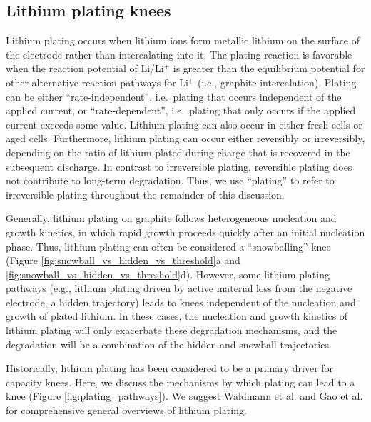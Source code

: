 \documentclass[journal=jpclcd,manuscript=article]{achemso}
\begin{document}
\subsection{Lithium plating knees}

Lithium plating occurs when lithium ions form metallic lithium on the surface of the electrode rather than intercalating into it. The plating reaction is favorable when the reaction potential of Li/Li$^+$ is greater than the equilibrium potential for other alternative reaction pathways for Li$^+$ (i.e., graphite intercalation).\cite{gao_interplay_2021} Plating can be either ``rate-independent'', i.e.\ plating that occurs independent of the applied current, or ``rate-dependent'', i.e.\ plating that only occurs if the applied current exceeds some value. 
Lithium plating can also occur in either fresh cells or aged cells.
Furthermore, lithium plating can occur either reversibly or irreversibly, depending on the ratio of lithium plated during charge that is recovered in the subsequent discharge.\cite{baure_synthetic_2019, dubarry_big_2020} In contrast to irreversible plating, reversible plating does not contribute to long-term degradation. Thus, we use ``plating'' to refer to irreversible plating throughout the remainder of this discussion.

Generally, lithium plating on graphite follows heterogeneous nucleation and growth kinetics, in which rapid growth proceeds quickly after an initial nucleation phase.\cite{ely_heterogeneous_2013, pei_nanoscale_2017, gao_interplay_2021}
Thus, lithium plating can often be considered a ``snowballing'' knee (Figure \ref{fig:snowball_vs_hidden_vs_threshold}a and \ref{fig:snowball_vs_hidden_vs_threshold}d). However, some lithium plating pathways (e.g., lithium plating driven by active material loss from the negative electrode, a hidden trajectory) leads to knees independent of the nucleation and growth of plated lithium.
In these cases, the nucleation and growth kinetics of lithium plating will only exacerbate these degradation mechanisms, and the degradation will be a combination of the hidden and snowball trajectories.

Historically, lithium plating has been considered to be a primary driver for capacity knees. Here, we discuss the mechanisms by which plating can lead to a knee (Figure \ref{fig:plating_pathways}). We suggest Waldmann et al.\cite{waldmann_li_2018} and Gao et al.\cite{gao_interplay_2021} for comprehensive general overviews of lithium plating.
\end{document}
